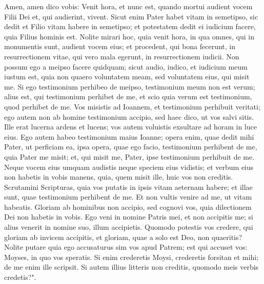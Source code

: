 \begin{biblechapter}
\verse Amen, amen dico vobis: Venit hora, et nunc est, quando mortui audient vocem Filii Dei et, qui audierint, vivent. 
\verse Sicut enim Pater habet vitam in semetipso, sic dedit et Filio vitam habere in semetipso;  
\verse et potestatem dedit ei iudicium facere, quia Filius hominis est. 
\verse Nolite mirari hoc, quia venit hora, in qua omnes, qui in monumentis sunt, audient vocem eius; 
\verse et procedent, qui bona fecerunt, in resurrectionem vitae, qui vero mala egerunt, in resurrectionem iudicii. 
\verse Non possum ego a meipso facere quidquam; sicut audio, iudico, et iudicium meum iustum est, quia non quaero voluntatem meam, sed voluntatem eius, qui misit me. 
\verse Si ego testimonium perhibeo de meipso, testimonium meum non est verum; 
\verse alius est, qui testimonium perhibet de me, et scio quia verum est testimonium, quod perhibet de me. 
\verse Vos misistis ad Ioannem, et testimonium perhibuit veritati; 
\verse ego autem non ab homine testimonium accipio, sed haec dico, ut vos salvi sitis. 
\verse Ille erat lucerna ardens et lucens; vos autem voluistis exsultare ad horam in luce eius. 
\verse Ego autem habeo testimonium maius Ioanne; opera enim, quae dedit mihi Pater, ut perficiam ea, ipsa opera, quae ego facio, testimonium perhibent de me, quia Pater me misit; 
\verse et, qui misit me, Pater, ipse testimonium perhibuit de me. Neque vocem eius umquam audistis neque speciem eius vidistis; 
\verse et verbum eius non habetis in vobis manens, quia, quem misit ille, huic vos non creditis. 
\verse Scrutamini Scripturas, quia vos putatis in ipsis vitam aeternam habere; et illae sunt, quae testimonium perhibent de me. 
\verse Et non vultis venire ad me, ut vitam habeatis. 
\verse Gloriam ab hominibus non accipio, 
\verse sed cognovi vos, quia dilectionem Dei non habetis in vobis. 
\verse Ego veni in nomine Patris mei, et non accipitis me; si alius venerit in nomine suo, illum accipietis. 
\verse Quomodo potestis vos credere, qui gloriam ab invicem accipitis, et gloriam, quae a solo est Deo, non quaeritis? 
\verse Nolite putare quia ego accusaturus sim vos apud Patrem; est qui accuset vos: Moyses, in quo vos speratis. 
\verse Si enim crederetis Moysi, crederetis forsitan et mihi; de me enim ille scripsit. 
\verse Si autem illius litteris non creditis, quomodo meis verbis credetis?". 
\end{biblechapter}

